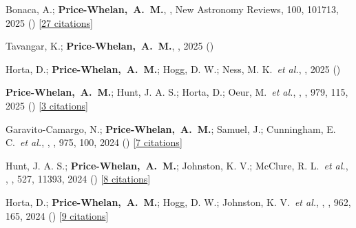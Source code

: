 \item[{\color{deemph}\scriptsize18}]Bonaca, A.; \textbf{Price-Whelan,~A.~M.}, , New Astronomy Reviews, 100, 101713, 2025 () [\href{http://adsabs.harvard.edu/abs/2025NewAR.10001713B}{27 citations}]

\item[{\color{deemph}\scriptsize17}]Tavangar, K.; \textbf{Price-Whelan,~A.~M.}, , 2025 ()

\item[{\color{deemph}\scriptsize16}]Horta, D.; \textbf{Price-Whelan,~A.~M.}; Hogg, D. W.; Ness, M. K.~\textit{et al.}, , 2025 ()

\item[{\color{deemph}\scriptsize15}]\textbf{Price-Whelan,~A.~M.}; Hunt, J. A. S.; Horta, D.; Oeur, M.~\textit{et al.}, , \apj, 979, 115, 2025 () [\href{http://adsabs.harvard.edu/abs/2025ApJ...979..115P}{3 citations}]

\item[{\color{deemph}\scriptsize14}]Garavito-Camargo, N.; \textbf{Price-Whelan,~A.~M.}; Samuel, J.; Cunningham, E. C.~\textit{et al.}, , \apj, 975, 100, 2024 () [\href{http://adsabs.harvard.edu/abs/2024ApJ...975..100G}{7 citations}]

\item[{\color{deemph}\scriptsize13}]Hunt, J. A. S.; \textbf{Price-Whelan,~A.~M.}; Johnston, K. V.; McClure, R. L.~\textit{et al.}, , \mnras, 527, 11393, 2024 () [\href{http://adsabs.harvard.edu/abs/2024MNRAS.52711393H}{8 citations}]

\item[{\color{deemph}\scriptsize12}]Horta, D.; \textbf{Price-Whelan,~A.~M.}; Hogg, D. W.; Johnston, K. V.~\textit{et al.}, , \apj, 962, 165, 2024 () [\href{http://adsabs.harvard.edu/abs/2024ApJ...962..165H}{9 citations}]

